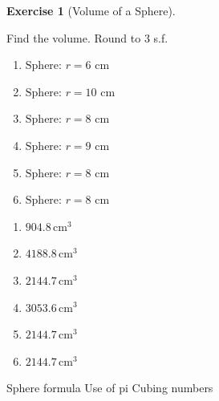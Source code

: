 \documentclass[
  letterpaper,
  DIV=11,
  numbers=noendperiod]{scrreprt}
\theoremstyle{definition}
\newtheorem{exercise}{Exercise}[chapter]
\theoremstyle{remark}
\begin{document}
\begin{exercise}[Volume of a
Sphere]\protect\hypertarget{exr-cur-7}{}\label{exr-cur-7}

Find the volume. Round to 3 s.f.

\begin{enumerate}
\def\labelenumi{\alph{enumi})}
\item
  \(\text{Sphere: }r=6\text{ cm}\)
\item
  \(\text{Sphere: }r=10\text{ cm}\)
\item
  \(\text{Sphere: }r=8\text{ cm}\)
\item
  \(\text{Sphere: }r=9\text{ cm}\)
\item
  \(\text{Sphere: }r=8\text{ cm}\)
\item
  \(\text{Sphere: }r=8\text{ cm}\)
\end{enumerate}

\begin{tcolorbox}[enhanced jigsaw, opacitybacktitle=0.6, coltitle=black, arc=.35mm, colframe=quarto-callout-tip-color-frame, colback=white, bottomrule=.15mm, left=2mm, colbacktitle=quarto-callout-tip-color!10!white, titlerule=0mm, opacityback=0, title=\textcolor{quarto-callout-tip-color}{\faLightbulb}\hspace{0.5em}{🔍 View Solution}, leftrule=.75mm, breakable, rightrule=.15mm, bottomtitle=1mm, toptitle=1mm, toprule=.15mm]

\begin{enumerate}
\def\labelenumi{\alph{enumi})}
\item
  \(904.8\,\text{cm}^{3}\)
\item
  \(4188.8\,\text{cm}^{3}\)
\item
  \(2144.7\,\text{cm}^{3}\)
\item
  \(3053.6\,\text{cm}^{3}\)
\item
  \(2144.7\,\text{cm}^{3}\)
\item
  \(2144.7\,\text{cm}^{3}\)
\end{enumerate}

\end{tcolorbox}

{Sphere formula} {Use of pi} {Cubing numbers}

\end{exercise}
\end{document}
